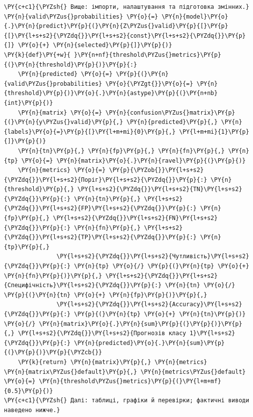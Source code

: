 \begin{Verbatim}[commandchars=\\\{\}]
\PY{c+c1}{\PYZsh{} Вище: імпорти, налаштування та підготовка змінних.}
\PY{n}{valid\PYZus{}probabilities} \PY{o}{=} \PY{n}{model}\PY{o}{.}\PY{n}{predict}\PY{p}{(}\PY{n}{Z\PYZus{}valid}\PY{p}{[}\PY{p}{[}\PY{l+s+s2}{\PYZdq{}}\PY{l+s+s2}{const}\PY{l+s+s2}{\PYZdq{}}\PY{p}{]} \PY{o}{+} \PY{n}{selected}\PY{p}{]}\PY{p}{)}
\PY{k}{def}\PY{+w}{ }\PY{n+nf}{threshold\PYZus{}metrics}\PY{p}{(}\PY{n}{threshold}\PY{p}{)}\PY{p}{:}
    \PY{n}{predicted} \PY{o}{=} \PY{p}{(}\PY{n}{valid\PYZus{}probabilities} \PY{o}{\PYZgt{}}\PY{o}{=} \PY{n}{threshold}\PY{p}{)}\PY{o}{.}\PY{n}{astype}\PY{p}{(}\PY{n+nb}{int}\PY{p}{)}
    \PY{n}{matrix} \PY{o}{=} \PY{n}{confusion\PYZus{}matrix}\PY{p}{(}\PY{n}{y\PYZus{}valid}\PY{p}{,} \PY{n}{predicted}\PY{p}{,} \PY{n}{labels}\PY{o}{=}\PY{p}{[}\PY{l+m+mi}{0}\PY{p}{,} \PY{l+m+mi}{1}\PY{p}{]}\PY{p}{)}
    \PY{n}{tn}\PY{p}{,} \PY{n}{fp}\PY{p}{,} \PY{n}{fn}\PY{p}{,} \PY{n}{tp} \PY{o}{=} \PY{n}{matrix}\PY{o}{.}\PY{n}{ravel}\PY{p}{(}\PY{p}{)}
    \PY{n}{metrics} \PY{o}{=} \PY{p}{\PYZob{}}\PY{l+s+s2}{\PYZdq{}}\PY{l+s+s2}{Поріг}\PY{l+s+s2}{\PYZdq{}}\PY{p}{:} \PY{n}{threshold}\PY{p}{,} \PY{l+s+s2}{\PYZdq{}}\PY{l+s+s2}{TN}\PY{l+s+s2}{\PYZdq{}}\PY{p}{:} \PY{n}{tn}\PY{p}{,} \PY{l+s+s2}{\PYZdq{}}\PY{l+s+s2}{FP}\PY{l+s+s2}{\PYZdq{}}\PY{p}{:} \PY{n}{fp}\PY{p}{,} \PY{l+s+s2}{\PYZdq{}}\PY{l+s+s2}{FN}\PY{l+s+s2}{\PYZdq{}}\PY{p}{:} \PY{n}{fn}\PY{p}{,} \PY{l+s+s2}{\PYZdq{}}\PY{l+s+s2}{TP}\PY{l+s+s2}{\PYZdq{}}\PY{p}{:} \PY{n}{tp}\PY{p}{,}
               \PY{l+s+s2}{\PYZdq{}}\PY{l+s+s2}{Чутливість}\PY{l+s+s2}{\PYZdq{}}\PY{p}{:} \PY{n}{tp} \PY{o}{/} \PY{p}{(}\PY{n}{tp} \PY{o}{+} \PY{n}{fn}\PY{p}{)}\PY{p}{,} \PY{l+s+s2}{\PYZdq{}}\PY{l+s+s2}{Специфічність}\PY{l+s+s2}{\PYZdq{}}\PY{p}{:} \PY{n}{tn} \PY{o}{/} \PY{p}{(}\PY{n}{tn} \PY{o}{+} \PY{n}{fp}\PY{p}{)}\PY{p}{,}
               \PY{l+s+s2}{\PYZdq{}}\PY{l+s+s2}{Accuracy}\PY{l+s+s2}{\PYZdq{}}\PY{p}{:} \PY{p}{(}\PY{n}{tp} \PY{o}{+} \PY{n}{tn}\PY{p}{)} \PY{o}{/} \PY{n}{matrix}\PY{o}{.}\PY{n}{sum}\PY{p}{(}\PY{p}{)}\PY{p}{,} \PY{l+s+s2}{\PYZdq{}}\PY{l+s+s2}{Прогнозів класу 1}\PY{l+s+s2}{\PYZdq{}}\PY{p}{:} \PY{n}{predicted}\PY{o}{.}\PY{n}{sum}\PY{p}{(}\PY{p}{)}\PY{p}{\PYZcb{}}
    \PY{k}{return} \PY{n}{matrix}\PY{p}{,} \PY{n}{metrics}
\PY{n}{matrix\PYZus{}default}\PY{p}{,} \PY{n}{metrics\PYZus{}default} \PY{o}{=} \PY{n}{threshold\PYZus{}metrics}\PY{p}{(}\PY{l+m+mf}{0.5}\PY{p}{)}
\PY{c+c1}{\PYZsh{} Далі: таблиці, графіки й перевірки; фактичні виводи наведено нижче.}
\end{Verbatim}
